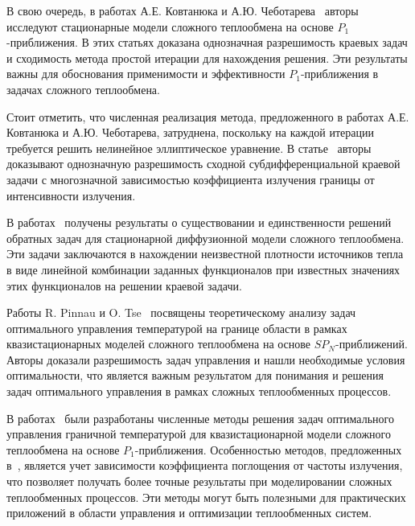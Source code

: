     В свою очередь, в работах А.Е. Ковтанюка и А.Ю. Чеботарева~\cite{Kovtanyuk2014, Kovtanyuk2016, Kovtanyuk2015}
    авторы исследуют стационарные модели сложного теплообмена на основе $P_1$-приближения.
    В этих статьях доказана однозначная разрешимость краевых задач
    и сходимость метода простой итерации для нахождения решения.
    Эти результаты важны для обоснования применимости и
    эффективности $P_1$-приближения в задачах сложного теплообмена.


    Стоит отметить, что численная реализация метода, предложенного в работах А.Е. Ковтанюка и А.Ю. Чеботарева,
    затруднена, поскольку на каждой итерации требуется решить нелинейное эллиптическое уравнение.
    В статье~\cite{Chebotarev2016Odnaznachnaya} авторы доказывают однозначную разрешимость
    сходной субдифференциальной краевой задачи с многозначной зависимостью коэффициента излучения
    границы от интенсивности излучения.

    В работах~\cite{astrakhantseva2017analysis, chebotarev2018inverse} получены результаты о существовании
    и единственности решений обратных задач для стационарной диффузионной модели сложного теплообмена.
    Эти задачи заключаются в нахождении неизвестной плотности источников тепла в виде линейной комбинации
    заданных функционалов при известных значениях этих функционалов на решении краевой задачи.

    Работы R. Pinnau и O. Tse~\cite{Pinnau2007, Pinnau2013} посвящены теоретическому анализу задач
    оптимального управления температурой на границе области в рамках квазистационарных моделей сложного
    теплообмена на основе $SP_N$-приближений.
    Авторы доказали разрешимость задач управления и нашли необходимые условия оптимальности,
    что является важным результатом для понимания и решения задач оптимального управления
    в рамках сложных теплообменных процессов.

    В работах~\cite{clever2012optimal, clever2014model, lang2005adaptive, frank2011adaptive, Pinnau2007b, Pinnau2013}
    были разработаны численные методы решения задач оптимального управления граничной температурой
    для квазистационарной модели сложного теплообмена на основе $P_1$-приближения.
    Особенностью методов, предложенных в~\cite{clever2012optimal, clever2014model, lang2005adaptive},
    является учет зависимости коэффициента поглощения от частоты излучения, что позволяет получать более
    точные результаты при моделировании сложных теплообменных процессов.
    Эти методы могут быть полезными для практических приложений
    в области управления и оптимизации теплообменных систем.


